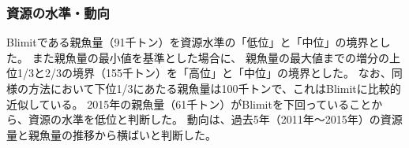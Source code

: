 \subsubsection{資源の水準・動向}
Blimitである親魚量（91千トン）を資源水準の「低位」と「中位」の境界とした。
また親魚量の最小値を基準とした場合に、
親魚量の最大値までの増分の上位1/3と2/3の境界（155千トン）を「高位」と「中位」の境界とした。
なお、同様の方法において下位1/3にあたる親魚量は100千トンで、これはBlimitに比較的近似している。
2015年の親魚量（61千トン）がBlimitを下回っていることから、資源の水準を低位と判断した。
動向は、過去5年（2011年～2015年）の資源量と親魚量の推移から横ばいと判断した。

